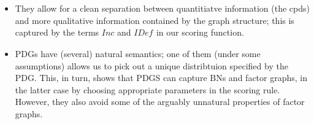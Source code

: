 \documentclass[letterpaper]{article} %
\theoremstyle{plain}
\theoremstyle{definition}
\theoremstyle{remark}
\newcommand{\commentout}[1]{\ignorespaces}
\newcommand{\IDef}[1]{\mathit{IDef}_{\!#1}}
\newcommand\Inc{\mathit{Inc}}
\begin{document}
\begin{itemize}
\commentout{
In contrast to factor graphs,
restrictions of PDGs continue to 
retain the same local commitment to the meanings of cpds in the
restriction; this is  
As a result, PDGs exhibit both flexibility and locality, making them
uniquely modular. 
}
\item They allow for a clean separation between quantitiatve
  information (the cpds) and more qualitative information contained by
    the graph structure; this is captured by the terms $\Inc$ and $\IDef{}$
  in our scoring function.
\item PDGs have (several) natural semantics;
one of them (under some assumptions) allows us to pick out a unique
distribtuion specified by the PDG.   This, in turn, shows that PDGS 
%
can capture BNs and factor graphs, in the latter case by choosing 
appropriate parameters in the scoring rule. However, they also avoid
some of the arguably unnatural properties of factor graphs.
\end{itemize}
\end{document}
